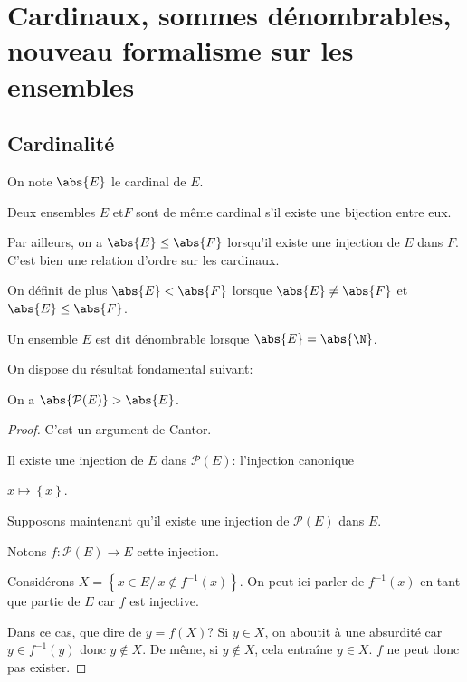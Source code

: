 %
%
%
%

\section{Cardinaux, sommes dénombrables, nouveau formalisme sur les ensembles}

\subsection{Cardinalité}

On note $\abs{E}$ le cardinal de $E$.

Deux ensembles $E$ et$F$ sont de même cardinal s'il existe une bijection entre eux.

Par ailleurs, on a $\abs{E} \leq \abs{F}$ lorsqu'il existe une injection de $E$ dans $F$. C'est bien une relation d'ordre sur les cardinaux.

On définit de plus $\abs{E}<\abs{F}$ lorsque $\abs{E} \neq \abs{F}$ et $\abs{E} \leq \abs{F}$.

Un ensemble $E$ est dit dénombrable lorsque $\abs{E} = \abs{\N}$.

On dispose du résultat fondamental suivant:
\begin{prop}
On a $\abs{\mathcal{P}(E)} > \abs{E}$.
\end{prop}

\begin{proof}
C'est un argument de Cantor.

Il existe une injection de $E$ dans $\mathcal{P}(E)$: l'injection canonique

$x \mapsto \left\{ x \right\}$.

Supposons maintenant qu'il existe une injection de $\mathcal{P}(E)$ dans $E$. 

Notons $f: \mathcal{P}(E) \to E$ cette injection.

Considérons $X=\left\{ x \in E / \, x \notin f^{-1}(x) \right\}$. On peut ici parler de $f^{-1}(x)$ en tant que partie de $E$ car $f$ est injective.

Dans ce cas, que dire de $y=f(X)$? Si $y \in X$, on aboutit à une absurdité car $y \in f^{-1}(y)$ donc $y \notin X$. De même, si $y \notin X$, cela entraîne $y \in X$. $f$ ne peut donc pas exister.
\end{proof}

